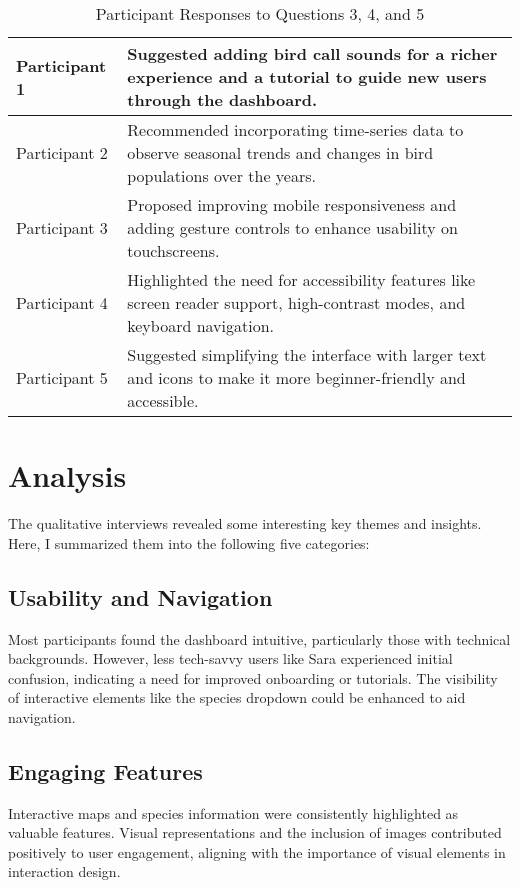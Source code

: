\begin{table}[H]
\begin{tabular}{p{3cm} | p{12cm}}
        \hline
        Participant 1 & Suggested adding bird call sounds for a richer experience and a tutorial to guide new users through the dashboard. \\
        \hline
        Participant 2 & Recommended incorporating time-series data to observe seasonal trends and changes in bird populations over the years. \\
        \hline
        Participant 3 & Proposed improving mobile responsiveness and adding gesture controls to enhance usability on touchscreens. \\
        \hline
        Participant 4 & Highlighted the need for accessibility features like screen reader support, high-contrast modes, and keyboard navigation. \\
        \hline
        Participant 5 & Suggested simplifying the interface with larger text and icons to make it more beginner-friendly and accessible. \\
        \hline
    \end{tabular}
    \caption{Participant Responses to Questions 3, 4, and 5}
    \label{tab:responses2}
\end{table}


\section{Analysis}

The qualitative interviews revealed some interesting key themes and insights. Here, I summarized them into the following five categories:

\subsection{Usability and Navigation}

Most participants found the dashboard intuitive, particularly those with technical backgrounds. However, less tech-savvy users like Sara experienced initial confusion, indicating a need for improved onboarding or tutorials. The visibility of interactive elements like the species dropdown could be enhanced to aid navigation.

\subsection{Engaging Features}

Interactive maps and species information were consistently highlighted as valuable features. Visual representations and the inclusion of images contributed positively to user engagement, aligning with the importance of visual elements in interaction design.

